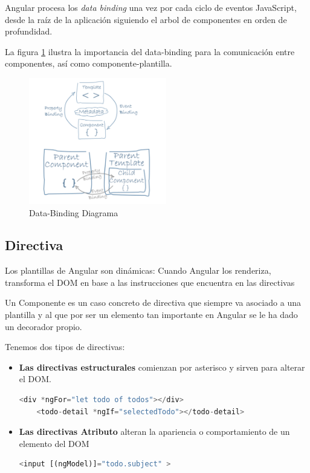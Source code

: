 Angular procesa los \textit{data binding} una vez por cada ciclo de eventos JavaScript, desde la raíz de la aplicación siguiendo el arbol de componentes en orden de profundidad.

La figura \ref{img:DatabindingAngular} ilustra la importancia del data-binding para la comunicación entre componentes, así como componente-plantilla.

\begin{figure}[!h]
    \centering
    \includegraphics[width=60mm]{img/infraestructura/databinding.png}
    \caption{Data-Binding Diagrama}
    \label{img:DatabindingAngular}
\end{figure}


\subsection{Directiva}

Los plantillas de Angular son dinámicas: Cuando Angular los renderiza, transforma el DOM en base a las instrucciones que encuentra en las directivas

Un Componente es un caso concreto de directiva que siempre va asociado a una plantilla y al que por ser un elemento tan importante en Angular se le ha dado un decorador propio.

Tenemos dos tipos de directivas:
\begin{itemize}
\item \textbf{Las directivas estructurales} comienzan por asterisco y sirven para alterar el DOM.
\begin{lstlisting}[language=javascript]
   <div *ngFor="let todo of todos"></div>
    <todo-detail *ngIf="selectedTodo"></todo-detail>
\end{lstlisting}
\item \textbf{Las directivas Atributo} alteran la apariencia o comportamiento de un elemento del DOM

\begin{lstlisting}[language=javascript]
   <input [(ngModel)]="todo.subject" >
\end{lstlisting}

\end{itemize}
